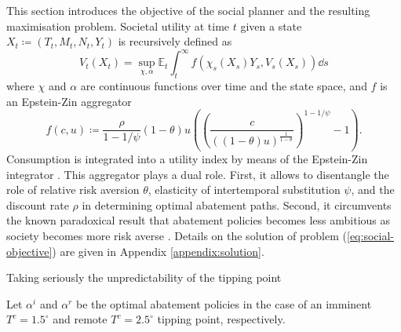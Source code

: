 \documentclass[../../main.tex]{subfiles}
\begin{document}
This section introduces the objective of the social planner and the resulting maximisation problem. Societal utility at time $t$ given a state $X_t \coloneqq (T_t, M_t, N_t, Y_t)$ is recursively defined as \begin{equation} \label{eq:social-objective}
    V_t(X_t) = \sup_{\chi, \alpha} \mathbb{E}_t 
    \int_{t}^{\infty} f(\chi_s(X_s) Y_s, V_s(X_s)) \dd{s}
\end{equation} where $\chi$ and $\alpha$ are continuous functions over time and the state space, and $f$ is an Epstein-Zin aggregator \begin{equation} \label{eq:aggregator}
    f(c, u) \coloneqq \frac{\rho}{1 - 1 / \psi} (1 - \theta) u  \left( \left(\frac{c}{((1 - \theta) u)^{\frac{1}{1 - \theta}}}\right)^{1 - 1 / \psi} - 1 \right).
\end{equation} Consumption is integrated into a utility index by means of the Epstein-Zin integrator \citep{duffie_asset_1992}. This aggregator plays a dual role. First, it allows to disentangle the role of relative risk aversion $\theta$, elasticity of intertemporal substitution $\psi$, and the discount rate $\rho$ in determining optimal abatement paths. Second, it circumvents the known paradoxical result that abatement policies becomes less ambitious as society becomes more risk averse \citep{pindyck_economic_2013}. Details on the solution of problem (\ref{eq:social-objective}) are given in Appendix \ref{appendix:solution}. 

Taking seriously the unpredictability of the tipping point 

Let $\alpha^{i}$ and $\alpha^{r}$ be the optimal abatement policies in the case of an imminent $T^c = 1.5^\circ$ and remote $T^c = 2.5^\circ$ tipping point, respectively.
\end{document}
